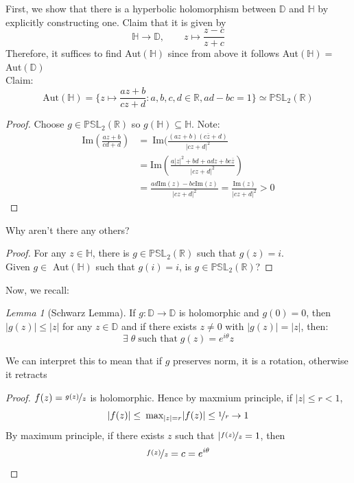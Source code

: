 \documentclass[a4paper, 11pt]{book}
\theoremstyle{definition}
\theoremstyle{remark}
\newtheorem{lemma}[theorem]{Lemma}
\begin{document}
    First, we show that there is a hyperbolic holomorphism between $\mathbb{D}$ and $\mathbb{H}$ by explicitly constructing one.
    Claim that it is given by
    \[ \mathbb{H}\to \mathbb{D},\qquad z\mapsto \frac{z-c}{z+c} \]
    Therefore, it suffices to find Aut$(\mathbb{H})$ since from above it follows Aut$(\mathbb{H})=$ Aut$(\mathbb{D})$\\
    Claim:
    \[ \text{Aut}(\mathbb{H}) = \{z\mapsto\frac{az+b}{cz+d}: a,b,c,d\in\mathbb{R}, ad-bc=1\} \simeq \mathbb{PSL}_2(\mathbb{R}) \]
    \begin{proof}
        Choose $g\in\mathbb{PSL}_2(\mathbb{R})$ so $g(\mathbb{H})\subseteq \mathbb{H}$. Note:
        \begin{align*}
            \text{Im}(\frac{az+b}{cd+d}) &=\:\text{Im}(\frac{(az+b)(c\overline{z}+d)}{|cz+d|^2} \\
            &= \text{Im}(\frac{a|z|^2+bd+adz+bc\overline{z}}{|cz+d|^2}) \\
            &= \frac{ad\text{Im}(z)-bc\text{Im}(z)}{|cz+d|^2} = \frac{\text{Im}(z)}{|cz+d|^2} > 0
        \end{align*}
    \end{proof}

    Why aren't there any others?
    \begin{proof}
        For any $z\in\mathbb{H}$, there is $g\in\mathbb{PSL}_2(\mathbb{R})$ such that $g(z) = i$.\\
        Given $g\in$ Aut$(\mathbb{H})$ such that $g(i) = i$, is $g\in\mathbb{PSL}_2(\mathbb{R})$?
    \end{proof}

    Now, we recall:
    \begin{lemma}[Schwarz Lemma]
        If $g:\mathbb{D}\to\mathbb{D}$ is holomorphic and $g(0)=0$, then $|g(z)| \leq |z|$ for any $z\in\mathbb{D}$ and if
        there exists $z\neq 0$ with $|g(z)|=|z|$, then:
        \[ \exists\; \theta\;\text{such that}\; g(z) = e^{i\theta}z \]
    \end{lemma}

    We can interpret this to mean that if $g$ preserves norm, it is a rotation, otherwise it retracts

    \begin{proof}
        $f(z) = \nicefrac{g(z)}{z}$ is holomorphic. Hence by maxmium principle, if $|z|\leq r<1$,
        \[ |f(z)| \leq\:\text{max}_{|z|=r} |f(z)| \leq \nicefrac{1}{r} \to 1 \]
        By maximum principle, if there exists $z$ such that $|\nicefrac{f(z)}{z} = 1$, then
        \[ \nicefrac{f(z)}{z} = c = e^{i\theta} \]
    \end{proof}
\end{document}
